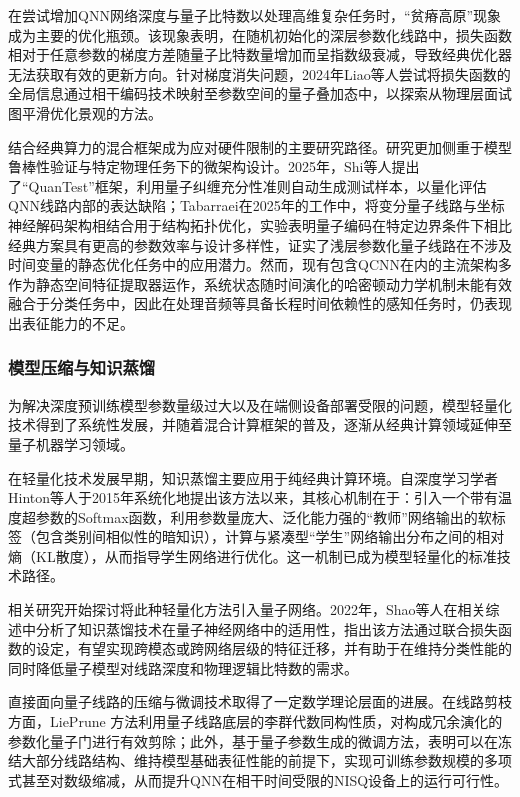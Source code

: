 在尝试增加QNN网络深度与量子比特数以处理高维复杂任务时，“贫瘠高原”现象成为主要的优化瓶颈。该现象表明，在随机初始化的深层参数化线路中，损失函数相对于任意参数的梯度方差随量子比特数量增加而呈指数级衰减，导致经典优化器无法获取有效的更新方向。针对梯度消失问题，2024年Liao等人尝试将损失函数的全局信息通过相干编码技术映射至参数空间的量子叠加态中，以探索从物理层面试图平滑优化景观的方法。

结合经典算力的混合框架成为应对硬件限制的主要研究路径。研究更加侧重于模型鲁棒性验证与特定物理任务下的微架构设计。2025年，Shi等人提出了“QuanTest”框架，利用量子纠缠充分性准则自动生成测试样本，以量化评估QNN线路内部的表达缺陷；Tabarraei在2025年的工作中，将变分量子线路与坐标神经解码架构相结合用于结构拓扑优化，实验表明量子编码在特定边界条件下相比经典方案具有更高的参数效率与设计多样性，证实了浅层参数化量子线路在不涉及时间变量的静态优化任务中的应用潜力。然而，现有包含QCNN在内的主流架构多作为静态空间特征提取器运作，系统状态随时间演化的哈密顿动力学机制未能有效融合于分类任务中，因此在处理音频等具备长程时间依赖性的感知任务时，仍表现出表征能力的不足。

\subsubsection{模型压缩与知识蒸馏}

为解决深度预训练模型参数量级过大以及在端侧设备部署受限的问题，模型轻量化技术得到了系统性发展，并随着混合计算框架的普及，逐渐从经典计算领域延伸至量子机器学习领域。

在轻量化技术发展早期，知识蒸馏主要应用于纯经典计算环境。自深度学习学者Hinton等人于2015年系统化地提出该方法以来，其核心机制在于：引入一个带有温度超参数的Softmax函数，利用参数量庞大、泛化能力强的“教师”网络输出的软标签（包含类别间相似性的暗知识），计算与紧凑型“学生”网络输出分布之间的相对熵（KL散度），从而指导学生网络进行优化。这一机制已成为模型轻量化的标准技术路径。

相关研究开始探讨将此种轻量化方法引入量子网络。2022年，Shao等人在相关综述中分析了知识蒸馏技术在量子神经网络中的适用性，指出该方法通过联合损失函数的设定，有望实现跨模态或跨网络层级的特征迁移，并有助于在维持分类性能的同时降低量子模型对线路深度和物理逻辑比特数的需求。

直接面向量子线路的压缩与微调技术取得了一定数学理论层面的进展。在线路剪枝方面，LiePrune 方法利用量子线路底层的李群代数同构性质，对构成冗余演化的参数化量子门进行有效剪除；此外，基于量子参数生成的微调方法，表明可以在冻结大部分线路结构、维持模型基础表征性能的前提下，实现可训练参数规模的多项式甚至对数级缩减，从而提升QNN在相干时间受限的NISQ设备上的运行可行性。

